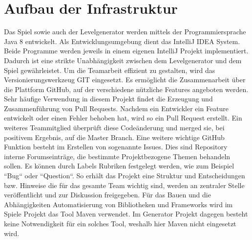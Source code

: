 \section{Aufbau der Infrastruktur}

Das Spiel sowie auch der Levelgenerator werden mittels der Programmiersprache Java 8 entwickelt. 
Als Entwicklungsumgebung dient das IntelliJ IDEA System. Beide Programme werden jeweils in einem eigenen IntelliJ Projekt implementiert. Dadurch ist eine strikte Unabhängigkeit zwischen dem Levelgenerator und dem Spiel gewährleistet.\newline
Um die Teamarbeit effizient zu gestalten, wird das Versionierungswerkzeug GIT eingesetzt. Es ermöglicht die Zusammenarbeit über die Plattform GitHub, auf der verschiedene nützliche Features angeboten werden. Sehr häufige Verwendung in diesem Projekt findet die Erzeugung und Zusammenführung von Pull Requests. Nachdem ein Entwickler ein Feature entwickelt oder einen Fehler behoben hat, wird so ein Pull Request erstellt. Ein weiteres Teammitglied überprüft diese Codeänderung und merged sie, bei positivem Ergebnis, auf die Master Branch.\newline
Eine weitere wichtige GitHub Funktion besteht im Erstellen von sogenannte Issues. Dies sind Repository interne Forumseinträge, die bestimmte Projektbezogene Themen behandeln sollen. Es können durch Labels Rubriken festgelegt werden, wie zum Beispiel ``Bug`` oder ``Question``. So erhält das Projekt eine Struktur und Entscheidungen bzw. Hinweise die für das gesamte Team wichtig sind, werden an zentraler Stelle veröffentlicht und zur Diskussion freigegeben.\newline
Für das Bauen und die Abhängigkeiten Automatisierung von Bibliotheken und Frameworks wird im Spiele Projekt das Tool Maven verwendet. Im Generator Projekt dagegen besteht keine Notwendigkeit für ein solches Tool, weshalb hier Maven nicht eingesetzt wird.\newline
